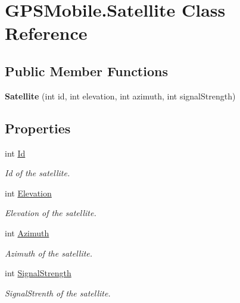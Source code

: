 \hypertarget{class_g_p_s_mobile_1_1_satellite}{
\section{GPSMobile.Satellite Class Reference}
\label{class_g_p_s_mobile_1_1_satellite}
}
\subsection*{Public Member Functions}
\begin{DoxyCompactItemize}
\item 
\hypertarget{class_g_p_s_mobile_1_1_satellite_abe898652ebc8e8988e964400eddea0b1}{
{\bfseries Satellite} (int id, int elevation, int azimuth, int signalStrength)}
\label{class_g_p_s_mobile_1_1_satellite_abe898652ebc8e8988e964400eddea0b1}

\end{DoxyCompactItemize}
\subsection*{Properties}
\begin{DoxyCompactItemize}
\item 
int \hyperlink{class_g_p_s_mobile_1_1_satellite_a52f3dd8cbcb1ba2f70f6dcbd996246f2}{Id}
\begin{DoxyCompactList}\small\item\em Id of the satellite. \item\end{DoxyCompactList}\item 
int \hyperlink{class_g_p_s_mobile_1_1_satellite_aa16b85b3ccd0946443f480a2c685d5c0}{Elevation}
\begin{DoxyCompactList}\small\item\em Elevation of the satellite. \item\end{DoxyCompactList}\item 
int \hyperlink{class_g_p_s_mobile_1_1_satellite_a3f2fdfad9d611ec2d7808dc489b8463b}{Azimuth}
\begin{DoxyCompactList}\small\item\em Azimuth of the satellite. \item\end{DoxyCompactList}\item 
int \hyperlink{class_g_p_s_mobile_1_1_satellite_a1a2411ab8219133b5979291e50f7de31}{SignalStrength}
\begin{DoxyCompactList}\small\item\em SignalStrenth of the satellite. \item\end{DoxyCompactList}\end{DoxyCompactItemize}



